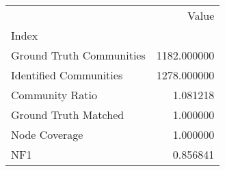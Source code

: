 \begin{tabular}{lr}
\toprule
{} &        Value \\
Index                    &              \\
\midrule
Ground Truth Communities &  1182.000000 \\
Identified Communities   &  1278.000000 \\
Community Ratio          &     1.081218 \\
Ground Truth Matched     &     1.000000 \\
Node Coverage            &     1.000000 \\
NF1                      &     0.856841 \\
\bottomrule
\end{tabular}
